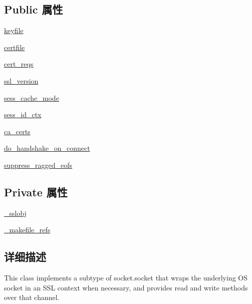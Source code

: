 \subsection*{Public 属性}
\begin{DoxyCompactItemize}
\item 
\mbox{\hyperlink{classforge_1_1ssl_1_1_s_s_l_socket_a95ee7412166c35665a476aa60222fe87}{keyfile}}
\item 
\mbox{\hyperlink{classforge_1_1ssl_1_1_s_s_l_socket_a3562b6e1eadabd53356d211f7d03a039}{certfile}}
\item 
\mbox{\hyperlink{classforge_1_1ssl_1_1_s_s_l_socket_a1266c34b9e0b1493b2bfcb35bca71684}{cert\+\_\+reqs}}
\item 
\mbox{\hyperlink{classforge_1_1ssl_1_1_s_s_l_socket_a0c5acb8e8e849a8cd4c58a68dee02824}{ssl\+\_\+version}}
\item 
\mbox{\hyperlink{classforge_1_1ssl_1_1_s_s_l_socket_a0612d90ce68eacadf3741707d170e92f}{sess\+\_\+cache\+\_\+mode}}
\item 
\mbox{\hyperlink{classforge_1_1ssl_1_1_s_s_l_socket_a64b55ecae20d607f84c8fa64bca066ed}{sess\+\_\+id\+\_\+ctx}}
\item 
\mbox{\hyperlink{classforge_1_1ssl_1_1_s_s_l_socket_a571438403f0b5c1d0a66c9e5729069bc}{ca\+\_\+certs}}
\item 
\mbox{\hyperlink{classforge_1_1ssl_1_1_s_s_l_socket_a948ce27f6c3ae2b3d38745838899ca81}{do\+\_\+handshake\+\_\+on\+\_\+connect}}
\item 
\mbox{\hyperlink{classforge_1_1ssl_1_1_s_s_l_socket_a9c816a1e9249f9ddbe51e5c51a18a2f5}{suppress\+\_\+ragged\+\_\+eofs}}
\end{DoxyCompactItemize}
\subsection*{Private 属性}
\begin{DoxyCompactItemize}
\item 
\mbox{\hyperlink{classforge_1_1ssl_1_1_s_s_l_socket_a781132ee3186976abdaeacc9af6a7089}{\+\_\+sslobj}}
\item 
\mbox{\hyperlink{classforge_1_1ssl_1_1_s_s_l_socket_a7001ca3e27be7d121411911813f70a31}{\+\_\+makefile\+\_\+refs}}
\end{DoxyCompactItemize}


\subsection{详细描述}
\begin{DoxyVerb}This class implements a subtype of socket.socket that wraps
the underlying OS socket in an SSL context when necessary, and
provides read and write methods over that channel.\end{DoxyVerb}
 

